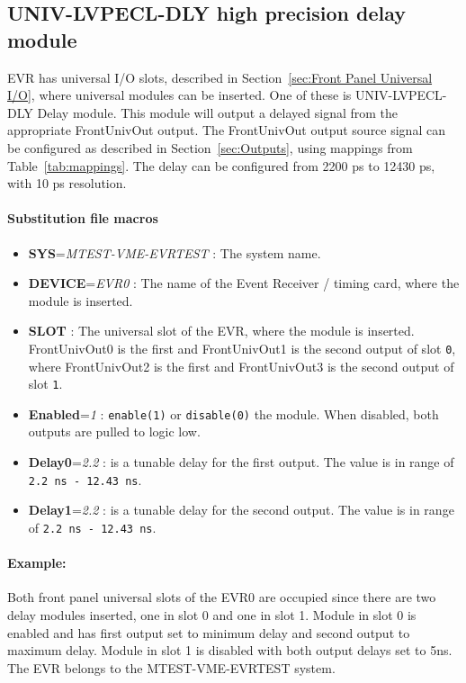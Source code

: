 \documentclass[12pt,a4paper]{article}
\begin{document}
\subsection{UNIV-LVPECL-DLY high precision delay module}\label{sec:UNIV-LVPECL-DLY}
EVR has universal I/O slots, described in Section~\ref{sec:Front Panel Universal I/O}, where universal modules can be inserted. One of these is UNIV-LVPECL-DLY Delay module. This module will output a delayed signal from the appropriate FrontUnivOut output. The FrontUnivOut output source signal can be configured as described in Section~\ref{sec:Outputs}, using mappings from Table~\ref{tab:mappings}. The delay can be configured from 2200 ps to 12430 ps, with 10 ps resolution. 


\paragraph{Substitution file macros}
\begin{itemize}
\item
	\textbf{SYS}=\emph{MTEST-VME-EVRTEST} : The system name.
\item
	\textbf{DEVICE}=\emph{EVR0} : The name of the Event Receiver / timing card, where the module is inserted.
\item
  \textbf{SLOT} : The universal slot of the EVR, where the module is inserted. FrontUnivOut0 is the first and FrontUnivOut1 is the second output of slot \texttt{0}, where FrontUnivOut2 is the first and FrontUnivOut3 is the second output of slot \texttt{1}.
\item
  \textbf{Enabled}=\emph{1} : \texttt{enable(1)} or \texttt{disable(0)} the module.
  When disabled, both outputs are pulled to logic low.
\item
  \textbf{Delay0}=\emph{2.2} : is a tunable delay for the first output. The value is
  in range of \texttt{2.2 ns - 12.43 ns}.
\item
  \textbf{Delay1}=\emph{2.2} : is a tunable delay for the second output. The value
  is in range of \texttt{2.2 ns - 12.43 ns}.
\end{itemize}

\paragraph{Example:} Both front panel universal slots of the EVR0 are occupied since there are
two delay modules inserted, one in slot 0 and one in slot 1. Module in
slot 0 is enabled and has first output set to minimum delay and second
output to maximum delay. Module in slot 1 is disabled with both output
delays set to 5ns. The EVR belongs to the MTEST-VME-EVRTEST system.
\end{document}
